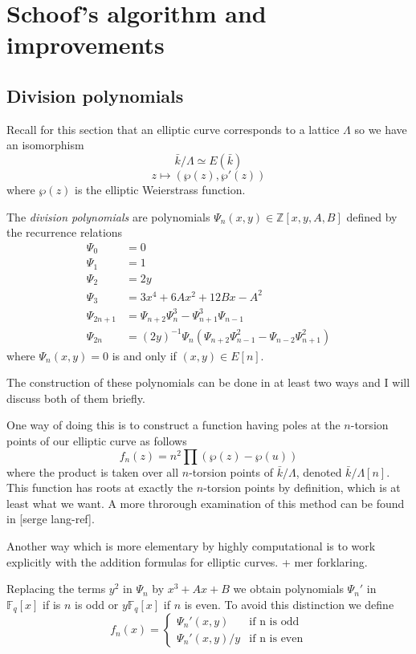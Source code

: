 \section{Schoof's algorithm and improvements}
\subsection{Division polynomials}
Recall for this section that an elliptic curve corresponds to a lattice $\Lambda$
so we have an isomorphism
$$ \bar{k}/\Lambda \simeq E(\bar{k}) $$
$$ z \mapsto (\wp(z), \wp '(z)) $$
where $\wp(z)$ is the elliptic Weierstrass function. 

\begin{mydef}
 The \emph{division polynomials} are polynomials $\Psi_n(x,y) \in \mathbb{Z}[x,y,A,B]$
defined by the recurrence relations
\begin{align*}
  \Psi_0 &= 0 \\
  \Psi_1 &= 1 \\
  \Psi_2 &= 2y \\
  \Psi_3 &= 3x^4 + 6Ax^2 + 12Bx - A^2 \\
  \Psi_{2n+1} &= \Psi_{n+2} \Psi_n^3 - \Psi_{n+1}^3 \Psi_{n-1} \\
  \Psi_{2n}   &= (2y)^{-1} \Psi_n(\Psi_{n+2} \Psi_{n-1}^2 - \Psi_{n-2} \Psi_{n+1}^2)
\end{align*}
where $\Psi_n(x,y) = 0$ is and only if $(x,y) \in E[n]$.
\end{mydef}
The construction of these polynomials can be done in at least two ways and I will discuss
both of them briefly.

One way of doing this is to construct
a function having poles at the $n$-torsion points of our elliptic curve as follows
$$ f_n(z) = n^2 \prod(\wp(z) - \wp(u)) $$
where the product is taken over all $n$-torsion points of $\bar{k}/\Lambda$, denoted
$\bar{k}/\Lambda[n]$. This function has roots at exactly the $n$-torsion points by definition,
which is at least what we want. A more throrough examination of this method can be found
in [serge lang-ref].

Another way which is more elementary by highly computational is to work explicitly
with the addition formulas for elliptic curves. + mer forklaring.

Replacing the terms $y^2$ in $\Psi_n$ by $x^3 + Ax + B$ we obtain polynomials $\Psi_n '$ in
$\mathbb{F}_q[x]$ if is $n$ is odd or $y \mathbb{F}_q[x]$ if $n$ is even. To avoid
this distinction we define
$$
f_n(x) = \begin{cases}
          \Psi_n '(x,y) & \text{if n is odd} \\
	  \Psi_n '(x,y)/y & \text{if n is even}
         \end{cases}
$$


